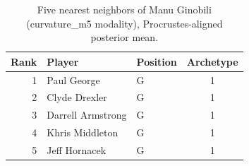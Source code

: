 \begin{table}[htbp]
  \centering\small
  \begin{tabular}{rllc}
    \toprule
    Rank & Player & Position & Archetype \\
    \midrule
    1 & Paul George & G & 1 \\
    2 & Clyde Drexler & G & 1 \\
    3 & Darrell Armstrong & G & 1 \\
    4 & Khris Middleton & G & 1 \\
    5 & Jeff Hornacek & G & 1 \\
    \bottomrule
  \end{tabular}
  \caption{Five nearest neighbors of Manu Ginobili (curvature_m5 modality), Procrustes-aligned posterior mean.}
  \label{tab:Manu_Ginobili_neighbors_curvature_m5}
\end{table}

